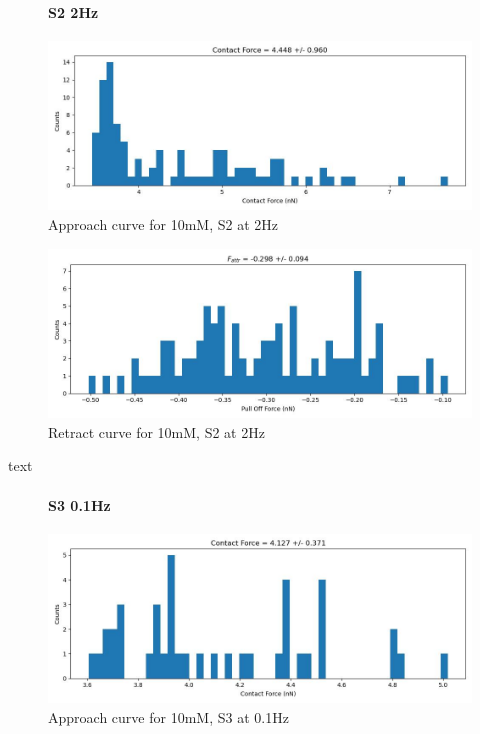 \begin{figure}[h!]
\paragraph{S2 2Hz}
\centering
\includegraphics[width=\textwidth]{chapter7/Tip speed/10mM/S2 2Hz/approach_f_c_hist.jpg}
\caption{Approach curve for 10mM, S2 at 2Hz}
\end{figure}

\begin{figure}[h!]
\centering
\includegraphics[width=\textwidth]{chapter7/Tip speed/10mM/S2 2Hz/retract_f_a_hist.jpg}
\caption{Retract curve for 10mM, S2 at 2Hz}
\end{figure}
text
\newpage


\begin{figure}[h!]
\paragraph{S3 0.1Hz}
\centering
\includegraphics[width=\textwidth]{chapter7/Tip speed/10mM/S3 0.1Hz/approach_f_c_hist.jpg}
\caption{Approach curve for 10mM, S3 at 0.1Hz}
\end{figure}

